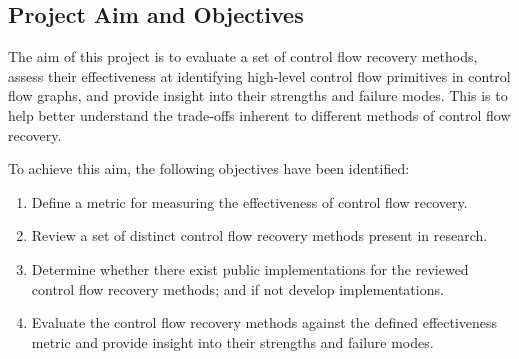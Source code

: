 
\subsection{Project Aim and Objectives}

The aim of this project is to evaluate a set of control flow recovery methods, assess their effectiveness at identifying high-level control flow primitives in control flow graphs, and provide insight into their strengths and failure modes. This is to help better understand the trade-offs inherent to different methods of control flow recovery.

To achieve this aim, the following objectives have been identified:

\begin{enumerate}
	\item \label{itm:obj_define_effectiveness_metric} Define a metric for measuring the effectiveness of control flow recovery.
	\item \label{itm:obj_review_cfa_methods} Review a set of distinct control flow recovery methods present in research.
	\item \label{itm:obj_cfa_components} Determine whether there exist public implementations for the reviewed control flow recovery methods; and if not develop implementations.
	\item \label{itm:obj_cfa_evaluation} Evaluate the control flow recovery methods against the defined effectiveness metric and provide insight into their strengths and failure modes.
\end{enumerate}
